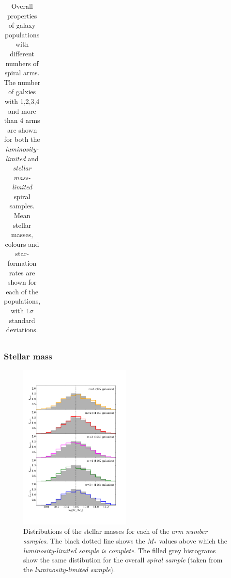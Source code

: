 \documentclass[useAMS,usenatbib]{mn2e}
\begin{document}
\begin{table}
\begin{tabular}{cccccc}
\hline

\end{tabular}

\caption{Overall properties of galaxy populations with different numbers of spiral arms. The number of galxies with 1,2,3,4 and more than 4 arms are shown for both the \textit{luminosity-limited} and \textit{stellar mass-limited} spiral samples. Mean stellar masses, colours and star-formation rates are shown for each of the populations, with $1\sigma$ standard deviations.}

\end{table}

\subsubsection{Stellar mass}

\begin{figure}
		\centering

        \includegraphics[width=0.5\textwidth]{Images/Results/mass_histograms.pdf}

        \caption{Distributions of the stellar masses for each of the \emph{arm number samples}. The black dotted line shows the $M_*$ values above which the \textit{luminosity-limited sample is complete}. The filled grey histograms show the same distibution for the overall \textit{spiral sample} (taken from the \textit{luminosity-limited sample}).}

        \label{fig:mass_histograms}

\end{figure}
\end{document}
